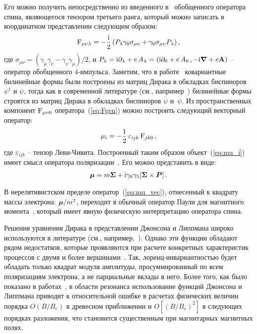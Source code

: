Его можно получить непосредственно 
из введенного в~\cite{Sokolov:1968} обобщенного оператора спина, 
являющегося тензором третьего ранга, который можно записать в координатном представлении следующим образом:
%
\begin{eqnarray}
	{\rm F}_{\mu \nu \lambda} = - \frac{\mathrm{i}}{2} \left( P_\lambda \gamma_0 \sigma_{\mu \nu} 
	+ \gamma_0 \sigma_{\mu \nu} P_\lambda \right),
	\label{eq:Fgen}
\end{eqnarray}
%
\noindent где $\sigma_{\mu \nu} = (\gamma_\mu \gamma_\nu - \gamma_\nu \gamma_\mu)/2$, и  
$P_\lambda = \mathrm{i} \partial_\lambda +e \, A_\lambda = \left( \mathrm{i} \partial_0 +e \, A_0 \,, 
- \mathrm{i} {\boldsymbol \nabla} +e {\bf A} \right)$ -- оператор обобщенного 4-импульса. 
Заметим, что в работе~\cite{Sokolov:1968} ковариантные билинейные формы были построены из матриц Дирака в обкладках  биспиноров 
$\psi^{\dagger}$ и $\psi$, тогда как в современной литературе (см., например~\cite{Peskin:1995}) билинейные формы строятся из матриц 
Дирака в обкладках биспиноров $\bar\psi$ и~$\psi$. Из пространственных компонент ${\rm F}_{\mu \nu 0}$ 
оператора~(\ref{eq:Fgen}) можно построить следующий векторный оператор:
%
\begin{eqnarray}
	\mu_i = - \frac{1}{2} \, \varepsilon_{ijk} \, {\rm F}_{jk0} \,, 
	\label{eq:mu_i}
\end{eqnarray}
%
где $\varepsilon_{ijk}$ -- тензор Леви-Чивита.  
Построенный таким образом объект~(\ref{eq:mu_i})  имеет смысл 
оператора поляризации~\cite{Sokolov:1968,Melrose:1983}.
Его можно представить в виде:
%
\begin{eqnarray}
	{\boldsymbol\mu} = m {\boldsymbol \Sigma} + \mathrm{i} \gamma_0 \gamma_5 [{\boldsymbol \Sigma} \times 
	{\boldsymbol P}] \, .
	\label{eq:mu_vec}
\end{eqnarray}

В нерелятивистском пределе оператор~(\ref{eq:mu_vec}), 
отнесенный к квадрату массы электрона:  ${\boldsymbol \mu}/m^2$,  
переходит в обычный оператор Паули для магнитного момента~\cite{Landau:1989}, 
который имеет явную физическую интерпретацию оператора спина.

Решения уравнения Дирака в представлении Джонсона и Липпмана широко используются в литературе (см., например,~\cite{Canuto:1975,Harding:1991,Suh:1999,Gonthier:2000,Jones:2010,Melrose:2020}). Однако эти функции обладают рядом недостатков, которые проявляются при расчете конкретных характеристик процессов с двумя и более вершинами~\cite{Kuznetsov:2013}. Так, лоренц-инвариантностью будет обладать только квадрат модуля амплитуды, просуммированный по всем поляризациям электрона, а не парциальные вклады в него. Более того, как было показано в работах~\cite{Graziani:1993,Gonthier:2014}, в области резонанса использование функций Джонсона и Липпмана приводит к относительной ошибке в расчетах физических величин порядка $O(B / B_{e})$ в древесном приближении и $O[(B / B_{e})^2]$ в следующих порядках разложения, что становится существенным при магнитарных магнитных полях.

